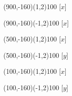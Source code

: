 \documentclass[12pt]{article}
\begin{document}
\begin{figure}[htb]
\begin{egame}
\renewcommand{\egarrowstyle}{e}

\putbranch(900,-160)(1,2){100}
[$x$]

\renewcommand{\egarrowstyle}{}

\putbranch(900,-160)(-1,2){100}
[$x$]

\renewcommand{\egarrowstyle}{}

\putbranch(500,-160)(1,2){100}
[$x$]

\renewcommand{\egarrowstyle}{}

\putbranch(500,-160)(-1,2){100}
[$y$]

\renewcommand{\egarrowstyle}{}

\putbranch(100,-160)(1,2){100}
[$x$]

\renewcommand{\egarrowstyle}{}

\putbranch(100,-160)(-1,2){100}
[$y$]

\renewcommand{\egarrowstyle}{}


\end{egame}
\end{figure}
\end{document}
